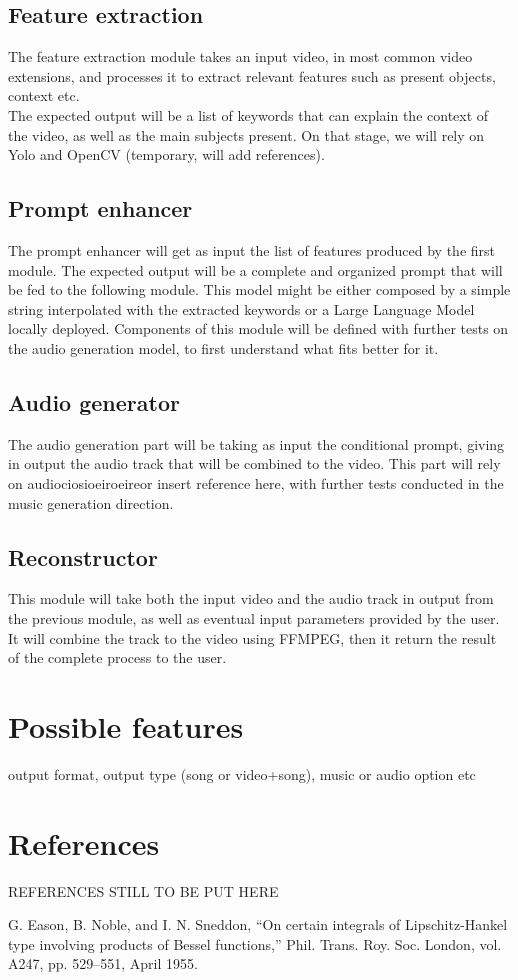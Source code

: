\documentclass[conference]{IEEEtran}
\begin{document}
\subsection{Feature extraction}
The feature extraction module takes an input video, in most common video extensions, and processes it to extract relevant features such as present objects, context etc.\\
The expected output will be a list of keywords that can explain the context of the video, as well as the main subjects present. On that stage, we will rely on Yolo and OpenCV (temporary, will add references).
\subsection{Prompt enhancer}
The prompt enhancer will get as input the list of features produced by the first module. The expected output will be a complete and organized prompt that will be fed to the following module. This model might be either composed by a simple string interpolated with the extracted keywords or a Large Language Model locally deployed. Components of this module will be defined with further tests on the audio generation model, to first understand what fits better for it. 
\subsection{Audio generator}
The audio generation part will be taking as input the conditional prompt, giving in output the audio track that will be combined to the video. This part will rely on audiociosioeiroeireor insert reference here, with further tests conducted in the music generation direction. 
\subsection{Reconstructor}
This module will take both the input video and the audio track in output from the previous module, as well as eventual input parameters provided by the user. It will combine the track to the video using FFMPEG, then it return the result of the complete process to the user. 

\section{Possible features}
output format, output type (song or video+song), music or audio option etc 
\section*{References}

REFERENCES STILL TO BE PUT HERE
\begin{thebibliography}{00}
 G. Eason, B. Noble, and I. N. Sneddon, ``On certain integrals of Lipschitz-Hankel type involving products of Bessel functions,'' Phil. Trans. Roy. Soc. London, vol. A247, pp. 529--551, April 1955.
\end{thebibliography}
\end{document}
